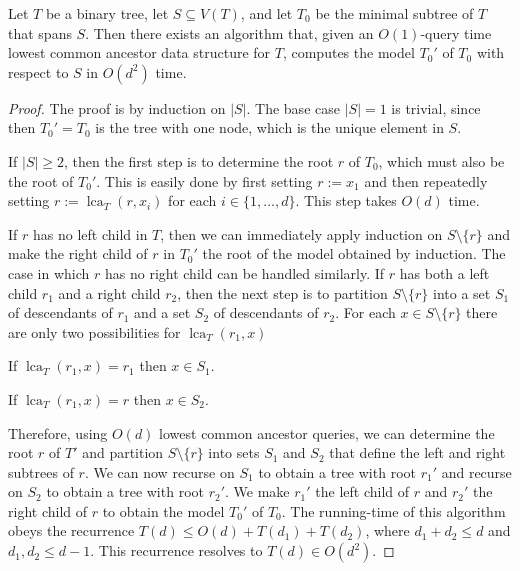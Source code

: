 \documentclass[a4paper,UKenglish,autoref]{lipics-v2021}
\DeclareMathOperator{\lca}{lca}
\begin{document}

\begin{lem}\label{reconstruction}
  Let $T$ be a binary tree, let $S\subseteq V(T)$, and let $T_0$ be the minimal subtree of $T$ that spans $S$. Then there exists an algorithm that, given an $O(1)$-query time lowest common ancestor data structure for $T$,  computes the model $T_0'$ of $T_0$ with respect to $S$ in $O(d^2)$ time.
\end{lem}

\begin{proof}
  The proof is by induction on $|S|$.  The base case $|S|=1$ is trivial, since then $T_0'=T_0$ is the tree with one node, which is the unique element in $S$.

  If $|S|\ge 2$, then the first step is to determine the root $r$ of $T_0$, which must also be the root of $T_0'$.  This is easily done by first setting $r:=x_1$ and then repeatedly setting $r:=\lca_{T}(r,x_i)$ for each $i\in\{1,\ldots,d\}$. This step takes $O(d)$ time.

  If $r$ has no left child in $T$, then we can immediately apply induction on $S\setminus\{r\}$ and make the right child of $r$ in $T_0'$ the root of the model obtained by induction.  The case in which $r$ has no right child can be handled similarly. If $r$ has both a left child $r_1$ and a right child $r_2$, then the next step is to partition $S\setminus\{r\}$ into a set $S_1$ of descendants of $r_1$ and a set $S_2$ of descendants of $r_2$.   For each $x\in S\setminus\{r\}$ there are only two possibilities for $\lca_{T}(r_1,x)$
  \begin{compactenum}
    \item If $\lca_{T}(r_1,x)=r_1$ then $x\in S_1$.
    \item If $\lca_{T}(r_1,x)=r$ then $x\in S_2$.
  \end{compactenum}
  Therefore, using $O(d)$ lowest common ancestor queries, we can determine the root $r$ of $T'$ and partition $S\setminus\{r\}$ into sets $S_1$ and $S_2$ that define the left and right subtrees of $r$.  We can now recurse on $S_1$ to obtain a tree with root $r_1'$ and recurse on $S_2$ to obtain a tree with root $r_2'$.  We make $r_1'$ the left child of $r$ and $r_2'$ the right child of $r$ to obtain the model $T_0'$ of $T_0$.  The running-time of this  algorithm obeys the recurrence $T(d)\le O(d)+T(d_1) + T(d_2)$, where $d_1 + d_2 \leq d$ and $d_1, d_2 \leq d-1$.  This recurrence resolves to $T(d)\in O(d^2)$.
\end{proof}
\end{document}
